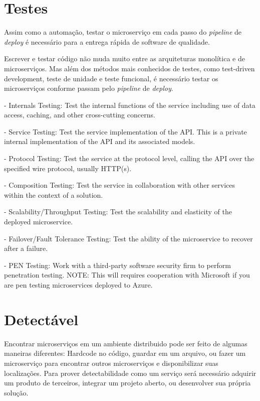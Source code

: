 \section{Testes}

Assim como a automação, testar o microserviço em cada passo do \emph{pipeline} de \emph{deploy} é necessário para a entrega rápida de software de qualidade.

Escrever e testar código não muda muito entre as arquiteturas monolítica e de microserviços. Mas além dos métodos mais conhecidos de testes, como test-driven development, teste de unidade e teste funcional, é necessário testar os microserviços conforme passam pelo \emph{pipeline} de \emph{deploy}.

- Internals Testing: Test the internal functions of the service including use of data access, caching, and other cross-cutting concerns.

- Service Testing: Test the service implementation of the API. This is a private internal implementation of the API and its associated models.

- Protocol Testing: Test the service at the protocol level, calling the API over the specified wire protocol, usually HTTP(s).

- Composition Testing: Test the service in collaboration with other services within the context of a solution.

- Scalability/Throughput Testing: Test the scalability and elasticity of the deployed microservice.

- Failover/Fault Tolerance Testing: Test the ability of the microservice to recover after a failure.

- PEN Testing: Work with a third-party software security firm to perform penetration testing. NOTE: This will requires cooperation with Microsoft if you are pen testing microservices deployed to Azure.

\section{Detectável}

Encontrar microserviços em um ambiente distribuido pode ser feito de algumas maneiras diferentes: Hardcode no código, guardar em um arquivo, ou fazer um microserviço para encontrar outros microserviços e disponibilizar suas localizações. Para prover detectabilidade como um serviço será necessário adquirir um produto de terceiros, integrar um projeto aberto, ou desenvolver sua própria solução.

